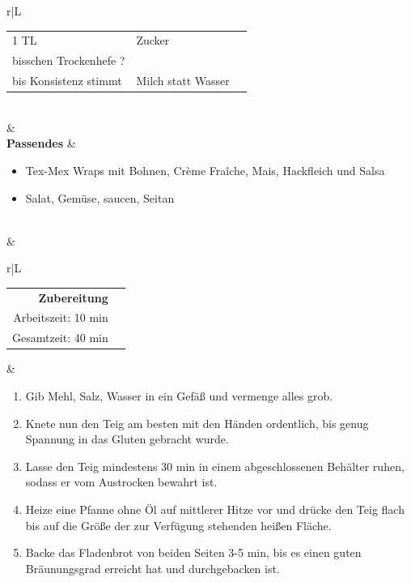 \documentclass[a4paper, 12pt]{scrbook} 								%
\numberwithin{equation}{section} 									%
\begin{document}
\begin{tabularx}{\textwidth}{r|L}
\begin{itemize}[]
\begin{tabular}{lll}
												1 TL & Zucker \\
												bisschen Trockenhefe ?\\
												bis Konsistenz stimmt & Milch statt Wasser \\
											\end{tabular} 
										\end{itemize}	\\
									&	\\	
			\textbf{Passendes}		&	\begin{itemize}[]
											\item Tex-Mex Wraps mit Bohnen, Crème Fraîche, Mais, Hackfleich und Salsa
											\item Salat, Gemüse, saucen, Seitan 
										\end{itemize}	\\
									&	\\
		\end{tabularx}
									\newpage

		\begin{tabularx}{\textwidth}{r|L}										
			\begin{tabular}[t]{rr}
				\textbf{Zubereitung}	\\
				Arbeitszeit: 10 min	\\
				Gesamtzeit:	40 min		\\
			\end{tabular}			&	\begin{enumerate}[]
											\item Gib Mehl, Salz, Wasser in ein Gefäß und vermenge alles grob.
											\item Knete nun den Teig am besten mit den Händen ordentlich, bis genug Spannung in das Gluten gebracht wurde.
											\item Lasse den Teig mindestens 30 min in einem abgeschlossenen Behälter ruhen, sodass er vom Austrocken bewahrt ist.
											\item Heize eine Pfanne ohne Öl auf mittlerer Hitze vor und drücke den Teig flach bis auf die Größe der zur Verfügung stehenden heißen Fläche.
											\item Backe das Fladenbrot von beiden Seiten 3-5 min, bis es einen guten Bräunungsgrad erreicht hat und durchgebacken ist.
										\end{enumerate}	\\
		\end{tabularx}
\end{document}
